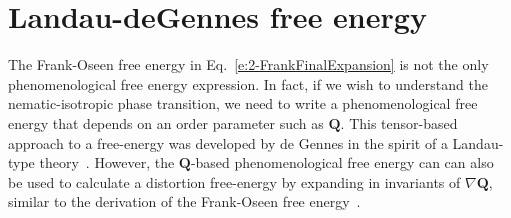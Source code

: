 \section{Landau-deGennes free energy}
The Frank-Oseen free energy in Eq.~\ref{e:2-FrankFinalExpansion} is not the only phenomenological free energy expression.
In fact, if we wish to understand the nematic-isotropic phase transition, we need to write a phenomenological free energy that depends on an order parameter such as $\mathbf{Q}$.
This tensor-based approach to a free-energy was developed by de Gennes in the spirit of a Landau-type theory~\cite{RN33}.
However, the $\mathbf{Q}$-based phenomenological free energy can can also be used to calculate a distortion free-energy by expanding in invariants of $\nabla \mathbf{Q}$, similar to the derivation of the Frank-Oseen free energy~\cite{RN33,RN189,RN198}.


